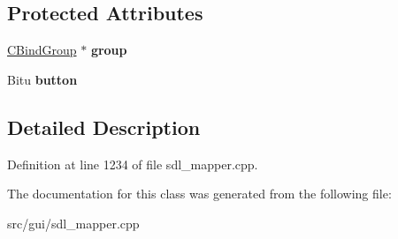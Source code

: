 \subsection*{Protected Attributes}
\begin{DoxyCompactItemize}
\item 
\hypertarget{classCJButtonBind_ade264023f83ad0202a6c5a2340d46833}{\hyperlink{classCBindGroup}{C\-Bind\-Group} $\ast$ {\bfseries group}}\label{classCJButtonBind_ade264023f83ad0202a6c5a2340d46833}

\item 
\hypertarget{classCJButtonBind_a6ef33ff006d574b8ea0df3ac18bf1a7a}{Bitu {\bfseries button}}\label{classCJButtonBind_a6ef33ff006d574b8ea0df3ac18bf1a7a}

\end{DoxyCompactItemize}


\subsection{Detailed Description}


Definition at line 1234 of file sdl\-\_\-mapper.\-cpp.



The documentation for this class was generated from the following file\-:\begin{DoxyCompactItemize}
\item 
src/gui/sdl\-\_\-mapper.\-cpp\end{DoxyCompactItemize}

